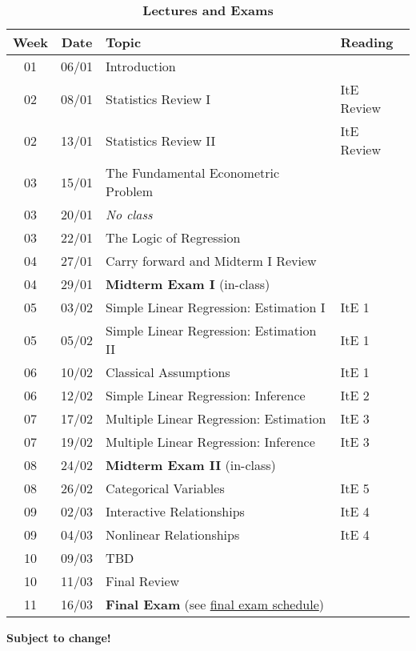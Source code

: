 \documentclass[11pt]{article}
\newcommand{\ra}[1]{\renewcommand{\arraystretch}{#1}}
\begin{document}
\begin{table}[H]
	\caption*{\large\textbf{Lectures and Exams}}
	\centering
  \ra{1.5}
  \begin{tabular}{@{\extracolsep{0.5cm}} c c l l @{}}
    \toprule
    \textbf{Week} & \textbf{Date} & \textbf{Topic} & \textbf{Reading}  \\ \toprule
    01 & 06/01 & Introduction & \\
    02 & 08/01 & Statistics Review I & ItE Review \\
    02 & 13/01 & Statistics Review II & ItE Review \\
    03 & 15/01 & The Fundamental Econometric Problem & \\
    03 & 20/01 & \textit{No class} &  \\
    03 & 22/01 & The Logic of Regression &  \\
    04 & 27/01 & Carry forward and Midterm I Review & \\ \midrule
    04 & 29/01 & \textbf{Midterm Exam I} (in-class) \\ \midrule
    05 & 03/02 & Simple Linear Regression: Estimation I & ItE 1  \\
    05 & 05/02 & Simple Linear Regression: Estimation II & ItE 1 \\
    06 & 10/02 & Classical Assumptions & ItE 1  \\
    06 & 12/02 & Simple Linear Regression: Inference & ItE 2 \\
    07 & 17/02 & Multiple Linear Regression: Estimation & ItE 3 \\
    07 & 19/02 & Multiple Linear Regression: Inference & ItE 3 \\  \midrule
    08 & 24/02 & \textbf{Midterm Exam II} (in-class) \\ \midrule
     08 & 26/02& Categorical Variables & ItE 5  \\
    09 & 02/03& Interactive Relationships & ItE 4  \\
    09 & 04/03& Nonlinear Relationships & ItE 4  \\
    10 & 09/03 & TBD &   \\
    10 & 11/03 & Final Review &\\
    11 & 16/03 & \textbf{Final Exam} (see \href{https://registrar.uoregon.edu/calendars/examinations#complete-final-exam-schedule}{\textcolor{PineGreen}{final exam schedule}}) \\
    \bottomrule
  \end{tabular}
\end{table}

\begin{center}
	\textbf{Subject to change!}
\end{center}
\end{document}
